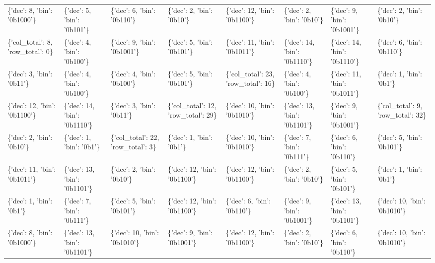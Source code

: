 \begin{tabular}{llllllll}
\hline
 \{'dec': 8, 'bin': '0b1000'\}      & \{'dec': 5, 'bin': '0b101'\}   & \{'dec': 6, 'bin': '0b110'\}        & \{'dec': 2, 'bin': '0b10'\}          & \{'dec': 12, 'bin': '0b1100'\}       & \{'dec': 2, 'bin': '0b10'\}    & \{'dec': 9, 'bin': '0b1001'\}  & \{'dec': 2, 'bin': '0b10'\}          \\
 \{'col\_total': 8, 'row\_total': 0\} & \{'dec': 4, 'bin': '0b100'\}   & \{'dec': 9, 'bin': '0b1001'\}       & \{'dec': 5, 'bin': '0b101'\}         & \{'dec': 11, 'bin': '0b1011'\}       & \{'dec': 14, 'bin': '0b1110'\} & \{'dec': 14, 'bin': '0b1110'\} & \{'dec': 6, 'bin': '0b110'\}         \\
 \{'dec': 3, 'bin': '0b11'\}        & \{'dec': 4, 'bin': '0b100'\}   & \{'dec': 4, 'bin': '0b100'\}        & \{'dec': 5, 'bin': '0b101'\}         & \{'col\_total': 23, 'row\_total': 16\} & \{'dec': 4, 'bin': '0b100'\}   & \{'dec': 11, 'bin': '0b1011'\} & \{'dec': 1, 'bin': '0b1'\}           \\
 \{'dec': 12, 'bin': '0b1100'\}     & \{'dec': 14, 'bin': '0b1110'\} & \{'dec': 3, 'bin': '0b11'\}         & \{'col\_total': 12, 'row\_total': 29\} & \{'dec': 10, 'bin': '0b1010'\}       & \{'dec': 13, 'bin': '0b1101'\} & \{'dec': 9, 'bin': '0b1001'\}  & \{'col\_total': 9, 'row\_total': 32\}  \\
 \{'dec': 2, 'bin': '0b10'\}        & \{'dec': 1, 'bin': '0b1'\}     & \{'col\_total': 22, 'row\_total': 3\} & \{'dec': 1, 'bin': '0b1'\}           & \{'dec': 10, 'bin': '0b1010'\}       & \{'dec': 7, 'bin': '0b111'\}   & \{'dec': 6, 'bin': '0b110'\}   & \{'dec': 5, 'bin': '0b101'\}         \\
 \{'dec': 11, 'bin': '0b1011'\}     & \{'dec': 13, 'bin': '0b1101'\} & \{'dec': 2, 'bin': '0b10'\}         & \{'dec': 12, 'bin': '0b1100'\}       & \{'dec': 12, 'bin': '0b1100'\}       & \{'dec': 2, 'bin': '0b10'\}    & \{'dec': 5, 'bin': '0b101'\}   & \{'dec': 1, 'bin': '0b1'\}           \\
 \{'dec': 1, 'bin': '0b1'\}         & \{'dec': 7, 'bin': '0b111'\}   & \{'dec': 5, 'bin': '0b101'\}        & \{'dec': 12, 'bin': '0b1100'\}       & \{'dec': 6, 'bin': '0b110'\}         & \{'dec': 9, 'bin': '0b1001'\}  & \{'dec': 13, 'bin': '0b1101'\} & \{'dec': 10, 'bin': '0b1010'\}       \\
 \{'dec': 8, 'bin': '0b1000'\}      & \{'dec': 13, 'bin': '0b1101'\} & \{'dec': 10, 'bin': '0b1010'\}      & \{'dec': 9, 'bin': '0b1001'\}        & \{'dec': 12, 'bin': '0b1100'\}       & \{'dec': 2, 'bin': '0b10'\}    & \{'dec': 6, 'bin': '0b110'\}   & \{'dec': 10, 'bin': '0b1010'\}       \\

\end{tabular}
